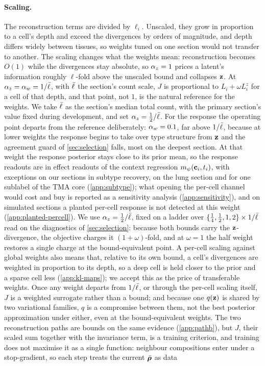 \paragraph{Scaling.}
  The reconstruction terms are divided by $\ell_i$. Unscaled, they grow in proportion to a cell's depth and exceed the divergences by orders of magnitude, and depth differs widely between tissues, so weights tuned on one section would not transfer to another. The scaling changes what the weights mean: reconstruction becomes $O(1)$ while the divergences stay absolute, so $\alpha_z = 1$ prices a latent's information roughly $\ell$-fold above the unscaled bound and collapses $\mathbf{z}$. At $\alpha_z = \alpha_w = 1/\bar{\ell}$, with $\bar{\ell}$ the section's count scale, $J$ is proportional to $L_i + \omega L_i^{z}$ for a cell of that depth, and that point, not $1$, is the natural reference for the weights. We take $\bar{\ell}$ as the section's median total count, with the primary section's value fixed during development, and set $\alpha_z = \tfrac12/\bar{\ell}$. For the response the operating point departs from the reference deliberately: $\alpha_w = 0.1$, far above $1/\bar{\ell}$, because at lower weights the response begins to take over type structure from $\mathbf{z}$ and the agreement guard of \cref{sec:selection} falls, most on the deepest section. At that weight the response posterior stays close to its prior mean, so the response readouts are in effect readouts of the context regression $m_{\psi}(\mathbf{c}_i, t_i)$, with exceptions on our sections in subtype recovery, on the lung section and for one sublabel of the TMA core (\cref{app:subtype}); what opening the per-cell channel would cost and buy is reported as a sensitivity analysis (\cref{app:sensitivity}), and on simulated sections a planted per-cell response is not detected at this weight (\cref{app:planted-percell}). We use $\alpha_z = \tfrac12/\bar{\ell}$, fixed on a ladder over $\{\tfrac14, \tfrac12, 1, 2\} \times 1/\bar{\ell}$ read on the diagnostics of \cref{sec:selection}: because both bounds carry the $\mathbf{z}$-divergence, the objective charges it $(1+\omega)$-fold, and at $\omega = 1$ the half weight restores a single charge at the bound-equivalent point. A per-cell scaling against global weights also means that, relative to its own bound, a cell's divergences are weighted in proportion to its depth, so a deep cell is held closer to the prior and a sparse cell less (\cref{app:kl-maps}); we accept this as the price of transferable weights. Once any weight departs from $1/\bar{\ell}$, or through the per-cell scaling itself, $J$ is a weighted surrogate rather than a bound; and because one $q(\mathbf{z})$ is shared by two variational families, $q$ is a compromise between them, not the best posterior approximation under either, even at the bound-equivalent weights. The two reconstruction paths are bounds on the same evidence (\cref{app:pathb}), but $J$, their scaled sum together with the invariance term, is a training criterion, and training does not maximise it as a single function: neighbour compositions enter under a stop-gradient, so each step treats the current $\bar{\boldsymbol{\rho}}$ as data 